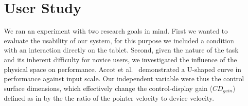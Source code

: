 \documentclass{chi-ext}
\begin{document}



\section{User Study}
We ran an experiment with two research goals in mind. First we wanted to evaluate the usability of our system, for this purpose we included a condition with an interaction directly on the tablet. Second, given the nature of the task and its inherent difficulty for novice users, we investigated the influence of the physical space on performance. Accot et al.~\cite{Accot2001} demonstrated a U-shaped curve in performance against input scale. Our independent variable were thus the control surface dimensions, which effectively change the control-display gain ($CD_{gain}$) defined as in \cite{Casiez2008} by the the ratio of the pointer velocity to device velocity.
\end{document}
